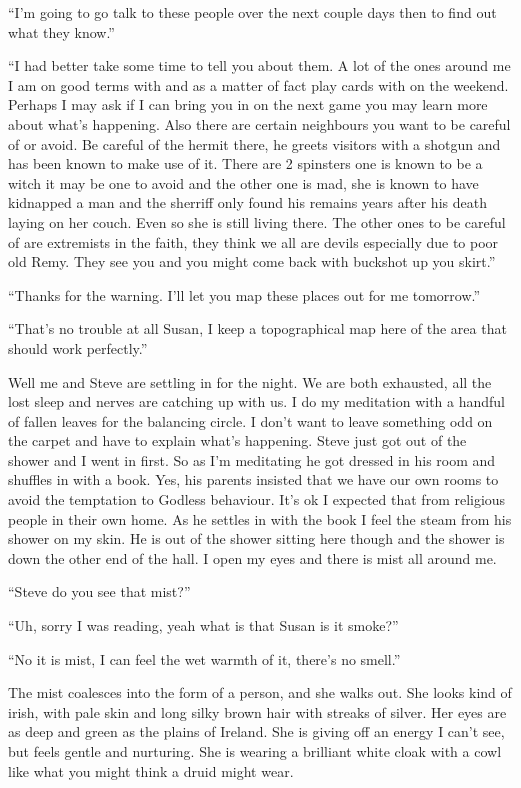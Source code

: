``I'm going to go talk to these people over the next couple days then to find out what they know.''

``I had better take some time to tell you about them. A lot of the ones around me I am on good terms with and as a matter of fact play cards with on the weekend. Perhaps I may ask if I can bring you in on the next game you may learn more about what's happening. Also there are certain neighbours you want to be careful of or avoid. Be careful of the hermit there, he greets visitors with a shotgun and has been known to make use of it. There are 2 spinsters one is known to be a witch it may be one to avoid and the other one is mad, she is known to have kidnapped a man and the sherriff only found his remains years after his death laying on her couch. Even so she is still living there. The other ones to be careful of are extremists in the faith, they think we all are devils especially due to poor old Remy. They see you and you might come back with buckshot up you skirt.''

``Thanks for the warning. I'll let you map these places out for me tomorrow.''

``That's no trouble at all Susan, I keep a topographical map here of the area that should work perfectly.''

\parasep

Well me and Steve are settling in for the night. We are both exhausted, all the lost sleep and nerves are catching up with us. I do my meditation with a handful of fallen leaves for the balancing circle. I don't want to leave something odd on the carpet and have to explain what's happening. Steve just got out of the shower and I went in first. So as I'm meditating he got dressed in his room and shuffles in with a book. Yes, his parents insisted that we have our own rooms to avoid the temptation to Godless behaviour. It's ok I expected that from religious people in their own home. As he settles in with the book I feel the steam from his shower on my skin. He is out of the shower sitting here though and the shower is down the other end of the hall. I open my eyes and there is mist all around me.

``Steve do you see that mist?''

``Uh, sorry I was reading, yeah what is that Susan is it smoke?''

``No it is mist, I can feel the wet warmth of it, there's no smell.''

The mist coalesces into the form of a person, and she walks out. She looks kind of irish, with pale skin and long silky brown hair with streaks of silver. Her eyes are as deep and green as the plains of Ireland. She is giving off an energy I can't see, but feels gentle and nurturing. She is wearing a brilliant white cloak with a cowl like what you might think a druid might wear.

